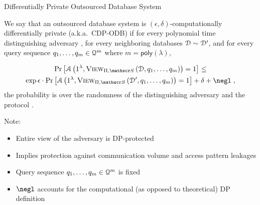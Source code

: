 	\begin{frame}{Differentially Private Outsourced Database System}

		\begin{definition}
			\justify%

			We say that an outsourced database system \protocol{} is $(\epsilon, \delta)$-computationally differentially private (a.k.a.~CDP-ODB) if for every polynomial time distinguishing adversary \adversary{}, for every neighboring databases $\mathcal{D} \sim \mathcal{D}^\prime$, and for every query sequence $\fromNtoM{\query}{1}{m} \in \querySet^m$ where $m = \mathsf{poly}(\lambda)$,

			\begin{multline*}
				\probability{\adversary \left( 1^\lambda, \view{\protocol, \server}{\database, \fromNtoM{\query}{1}{m}} \right) = 1 } \leq \\
				\exp{\epsilon} \cdot \probability{\adversary \left( 1^\lambda, \view{\protocol ,\server}{\database^\prime, \fromNtoM{\query}{1}{m}} \right) = 1} + \delta + \negl \; ,
			\end{multline*}
			the probability is over the randomness of the distinguishing adversary \adversary{} and the protocol \protocol{}.
		\end{definition}

		\pause%

		Note:
		\begin{itemize}
			\item Entire view of the adversary is DP-protected
			\item Implies protection against communication volume and access pattern leakages
			\item Query sequence $\fromNtoM{\query}{1}{m} \in \querySet^m$ is fixed
			\item $\negl$ accounts for the computational (as opposed to theoretical) DP definition
		\end{itemize}

	\end{frame}
